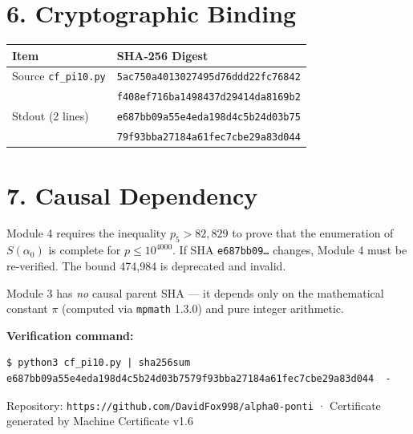 \documentclass[11pt,letterpaper]{article}
\begin{document}
\section*{6. Cryptographic Binding}

\begin{center}
\begin{tabular}{|l|l|}
\hline
\textbf{Item} & \textbf{SHA-256 Digest} \\
\hline
Source \texttt{cf\_pi10.py} & \texttt{5ac750a4013027495d76ddd22fc76842} \\
 & \texttt{f408ef716ba1498437d29414da8169b2} \\
\hline
Stdout (2 lines) & \texttt{e687bb09a55e4eda198d4c5b24d03b75} \\
 & \texttt{79f93bba27184a61fec7cbe29a83d044} \\
\hline
\end{tabular}
\end{center}

\section*{7. Causal Dependency}

Module 4 requires the inequality $p_5 > 82{,}829$ to prove that the enumeration of
$S(\alpha_0)$ is complete for $p \leq 10^{4000}$.
If SHA \texttt{e687bb09\ldots} changes, Module 4 must be re-verified.
The bound 474,984 is deprecated and invalid.

Module 3 has \emph{no} causal parent SHA --- it depends only on the mathematical
constant $\pi$ (computed via \texttt{mpmath} 1.3.0) and pure integer arithmetic.

\vspace{1em}
\noindent\textbf{Verification command:}
\begin{lstlisting}
$ python3 cf_pi10.py | sha256sum
e687bb09a55e4eda198d4c5b24d03b7579f93bba27184a61fec7cbe29a83d044  -
\end{lstlisting}

\vspace{0.5em}
\noindent\small Repository: \texttt{https://github.com/DavidFox998/alpha0-ponti} ·
Certificate generated by Machine Certificate v1.6
\end{document}

